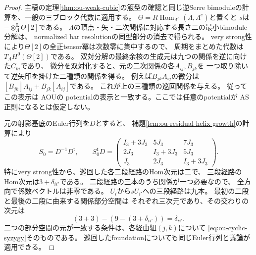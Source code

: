\begin{proof}
主稿の定理\ref{thm:ou-weak-cubic}の箙型の確認と同じ逆Serre
bimoduleの計算を、一般の三ブロック代数に適用する。
$\Theta=R\operatorname{Hom}_{\Lambda^e}(\Lambda,\Lambda^e)$と置くと
$s$は$-\otimes_\Lambda^{\mathbf L}\Theta[2]$である。
$\Lambda$の頂点・矢・二次関係に対応する長さ二の最小bimodule分解は、
normalized bar resolutionの同型部分の消去で得られる。
very strong性により$\Theta[2]$の全正tensor冪は次数零に集中するので、
周期をまとめた代数は$T_\Lambda H^0(\Theta[2])$である。
双対分解の最終余核の生成元は九つの関係を逆に向けた$C_{ki}$であり、
微分を双対化すると、元の二次関係の各$A_{ij},B_{jk}$を
一つ取り除いて逆矢印を掛けた二種類の関係を得る。
例えば$B_{jk}A_{ij}$の微分は
$[B_{jk}]A_{ij}+B_{jk}[A_{ij}]$である。
これが上の三種類の巡回関係を与える。
従ってこの表示は
AOU\cite[(4.7), (4.10), Proposition~5.1]{AOU2024}の
potentialの表示と一致する。ここでは任意のpotentialが
AS正則になるとは仮定しない。

元の射影基底のEuler行列を$D$とすると、
補題\ref{lem:ou-residual-helix-growth}の計算により
\[
 S_0=D^{-1}D^{\mathsf t},\qquad
 S_0^{\mathsf t}D=
 \begin{pmatrix}
 I_3+3J_3&5J_3&7J_3\\
 2J_3&I_3+3J_3&5J_3\\
 J_3&2J_3&I_3+3J_3
 \end{pmatrix}.
\]
特にvery strong性から、巡回した各二段経路のHom次元は二で、
三段経路のHom次元は$3+\delta_{ii'}$である。
二段経路の三本のうち関係が一つ必要なので、
全方向で係数ベクトルは非零である。
$U_i$から$sU_{i'}$への三段経路は九本。
最初の二段と最後の二段に由来する関係部分空間は
それぞれ三次元であり、その交わりの次元は
\[
 (3+3)-(9-(3+\delta_{ii'}))=\delta_{ii'}.
\]
二つの部分空間の元が一致する条件は、各経由組$(j,k)$について
\eqref{eq:ou-cyclic-syzygy}そのものである。
巡回したfoundationについても同じEuler行列と議論が適用できる。
\end{proof}

